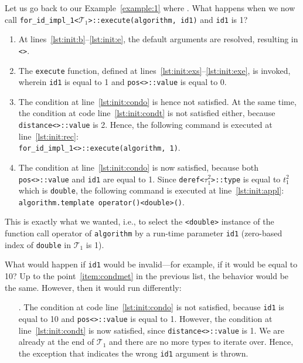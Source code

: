 \documentclass[10pt,a4paper]{article}
\theoremstyle{definition}\newtheorem{problem}{Problem}
\providecommand{\symtypeset}[1]{\ensuremath{\mathcal{T}_{#1}}}
\providecommand{\symtype}[2]{\ensuremath{t_{#1}^{#2}}}
\providecommand{\symiter}[2]{\ensuremath{\tau_{#1}^{#2}}}
\begin{document}
Let us go back to our Example~\ref{example:1} where . What happens when we now call \texttt{for\_id\_impl\_1<}\symtypeset{1}\texttt{>::execute(algorithm, id1)} and \texttt{id1} is 1?
\begin{enumerate}

\item At lines~\ref{lst:init:b}--\ref{lst:init:e}, the default arguments are resolved, resulting in \texttt{<}\texttt{>}.

\item The \texttt{execute} function, defined at lines~\ref{lst:init:exs}--\ref{lst:init:exe}, is invoked, wherein \texttt{id1} is equal to 1 and \texttt{pos<}\texttt{>::value} is equal to 0.

\item \label{item:condmet} The condition at line~\ref{lst:init:condo} is hence not satisfied. At the same time, the condition at code line~\ref{lst:init:condt} is not satisfied either, because \verb|distance<|\verb|>::value| is 2. Hence, the following command is executed at line~\ref{lst:init:rec}:\\ \texttt{for\_id\_impl\_1<}\texttt{>::execute(algorithm, 1)}.

\item The condition at line~\ref{lst:init:condo} is now satisfied, because both \texttt{pos<}\texttt{>::value} and \texttt{id1} are equal to 1. Since \texttt{deref<}\symiter{1}{2}\texttt{>::type} is equal to \symtype{1}{2} which is \texttt{double}, the following command is executed at line~\ref{lst:init:appl}:\\ \texttt{algorithm.template operator()<double>()}.

\end{enumerate}
This is exactly what we wanted, i.e., to select the \texttt{<double>} instance of the function call operator of \texttt{algorithm} by a run-time parameter \texttt{id1} (zero-based index of \texttt{double} in \symtypeset{1} is 1).

What would happen if \texttt{id1} would be invalid---for example, if it would be equal to 10? Up to the point~\ref{item:condmet} in the previous list, the behavior would be the same. However, then it would run differently:
\begin{enumerate}

\item[.] The condition at code line~\ref{lst:init:condo} is not satisfied, because \texttt{id1} is equal to 10 and \texttt{pos<}\texttt{>::value} is equal to 1. However, the condition at line~\ref{lst:init:condt} is now satisfied, since \texttt{dis\-ta\-nce<}\verb|>::value| is 1. We are already at the end of \symtypeset{1} and there are no more types to iterate over. Hence, the exception that indicates the wrong \texttt{id1} argument is thrown.

\end{enumerate}
\end{document}
